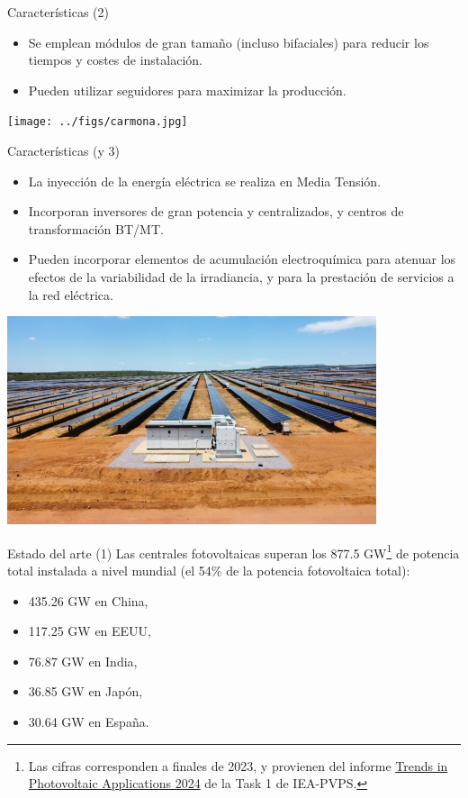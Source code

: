 \documentclass[aspectratio=169, usenames,svgnames,dvipsnames]{beamer}
\begin{document}
\begin{frame}[label={sec:org587e829}]{Características (2)}
\begin{itemize}
\item Se emplean \alert{módulos de gran tamaño} (incluso bifaciales) para reducir los tiempos y costes de instalación.
\item Pueden utilizar \alert{seguidores} para maximizar la producción.
\end{itemize}

\begin{center}
\texttt{[image: ../figs/carmona.jpg]}
\end{center}
\end{frame}
\begin{frame}[label={sec:org34a859f}]{Características (y 3)}
\begin{itemize}
\item La inyección de la energía eléctrica se realiza en \alert{Media Tensión}.
\item Incorporan \alert{inversores de gran potencia} y centralizados, y centros de transformación BT/MT.
\item Pueden incorporar \alert{elementos de acumulación electroquímica} para atenuar los efectos de la variabilidad de la irradiancia, y para la prestación de servicios a la red eléctrica.
\end{itemize}

\begin{center}
\includegraphics[height=0.5\textheight]{../figs/1power_station_de_ingeteam_en_la_planta_pv_bon_nome.jpg}
\end{center}
\end{frame}
\begin{frame}[label={sec:orgd92c0dd}]{Estado del arte (1)}
Las centrales fotovoltaicas superan los 877.5 GW\footnote{Las cifras corresponden a finales de 2023, y provienen del informe \guillemotleft{}\href{https://iea-pvps.org/trends\_reports/trends-in-pv-applications-2024/}{Trends in Photovoltaic Applications 2024}\guillemotright{} de la Task 1 de IEA-PVPS.}  de potencia total instalada a nivel mundial (el 54\% de la potencia fotovoltaica total):
\begin{itemize}
\item 435.26 GW en China,
\item 117.25 GW en EEUU,
\item 76.87 GW en India,
\item 36.85 GW en Japón,
\item 30.64 GW en España.
\end{itemize}
\end{frame}
\end{document}
